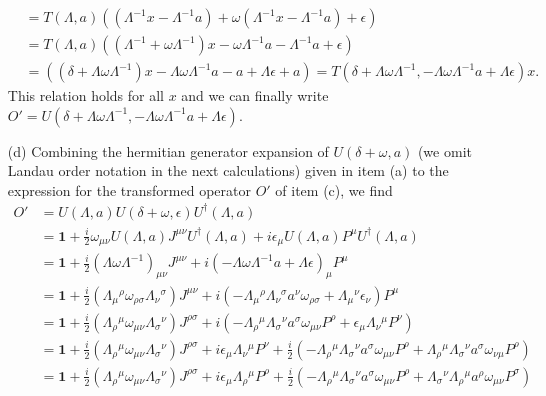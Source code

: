\documentclass[10pt, a4paper]{article}
\begin{document}
\begin{enumerate}
\begin{align*}
    &= T(\Lambda, a) ((\Lambda^{-1} x - \Lambda^{-1} a) + \omega(\Lambda^{-1} x - \Lambda^{-1} a) + \epsilon)\\
    &= T(\Lambda, a) ((\Lambda^{-1} + \omega \Lambda^{-1})  x -\omega \Lambda^{-1} a - \Lambda^{-1} a + \epsilon)\\
    &= ((\delta + \Lambda \omega \Lambda^{-1})  x -\Lambda\omega \Lambda^{-1} a - a + \Lambda \epsilon + a) = T(\delta + \Lambda \omega \Lambda^{-1}, -\Lambda\omega \Lambda^{-1} a + \Lambda \epsilon )x.
  \end{align*}
  This relation holds for all $x$ and we can finally write $O' = U(\delta + \Lambda \omega \Lambda^{-1}, -\Lambda\omega \Lambda^{-1} a + \Lambda \epsilon)$.
\newpage
  \item[(d)] Combining the hermitian generator expansion of $U(\delta + \omega, a)$ (we omit Landau order notation in the next calculations) given in item (a) to the expression for the transformed operator $O'$ of item (c), we find
  \begin{align*}
    O' &= U(\Lambda, a) U(\delta+\omega, \epsilon) U^\dagger(\Lambda, a)\tag{$\star$}\\&=\mathbf{1}+\frac{i}{2} \omega_{\mu \nu} U(\Lambda, a)J^{\mu \nu}U^\dagger(\Lambda, a)+i \epsilon_\mu U(\Lambda, a)P^\mu U^\dagger(\Lambda, a)\\
    &= \mathbf{1}+\frac{i}{2} (\Lambda \omega \Lambda^{-1})_{\mu \nu} J^{\mu \nu}+i (-\Lambda\omega \Lambda^{-1} a + \Lambda \epsilon)_\mu P^\mu\\
    &= \mathbf{1}+\frac{i}{2} (\Lambda_{\mu}{}^{\rho}  \omega_{\rho\sigma} \Lambda_{\nu}{}^{\sigma}) J^{\mu \nu}+i (-\Lambda_{\mu}{}^{\rho}   \Lambda_{\nu}{}^{\sigma} a^{\nu} \omega_{\rho\sigma} + \Lambda_{\mu}{}^{\nu} \epsilon_{\nu}) P^\mu \\
    &= \mathbf{1}+\frac{i}{2} (\Lambda_{\rho}{}^{\mu}  \omega_{\mu\nu} \Lambda_{\sigma}{}^{\nu}) J^{\rho \sigma}+i (-\Lambda_{\rho}{}^{\mu}   \Lambda_{\sigma}{}^{\nu} a^{\sigma} \omega_{\mu\nu} P^\rho +  \epsilon_{\mu} \Lambda_{\nu}{}^{\mu} P^\nu)\\ 
    &= \mathbf{1}+\frac{i}{2} (\Lambda_{\rho}{}^{\mu}  \omega_{\mu\nu} \Lambda_{\sigma}{}^{\nu}) J^{\rho \sigma}+i \epsilon_{\mu} \Lambda_{\nu}{}^{\mu} P^\nu + \frac{i}{2}(-\Lambda_{\rho}{}^{\mu}   \Lambda_{\sigma}{}^{\nu} a^{\sigma} \omega_{\mu\nu} P^\rho +\Lambda_{\rho}{}^{\mu}   \Lambda_{\sigma}{}^{\nu} a^{\sigma} \omega_{\nu\mu} P^\rho)\\ 
    &= \mathbf{1}+\frac{i}{2} (\Lambda_{\rho}{}^{\mu}  \omega_{\mu\nu} \Lambda_{\sigma}{}^{\nu}) J^{\rho \sigma}+i \epsilon_{\mu} \Lambda_{\rho}{}^{\mu} P^\rho + \frac{i}{2}(-\Lambda_{\rho}{}^{\mu}   \Lambda_{\sigma}{}^{\nu} a^{\sigma} \omega_{\mu\nu} P^\rho + \Lambda_{\sigma}{}^{\nu}   \Lambda_{\rho}{}^{\mu} a^{\rho} \omega_{\mu\nu} P^\sigma)

\end{align*}
\end{enumerate}
\end{document}
